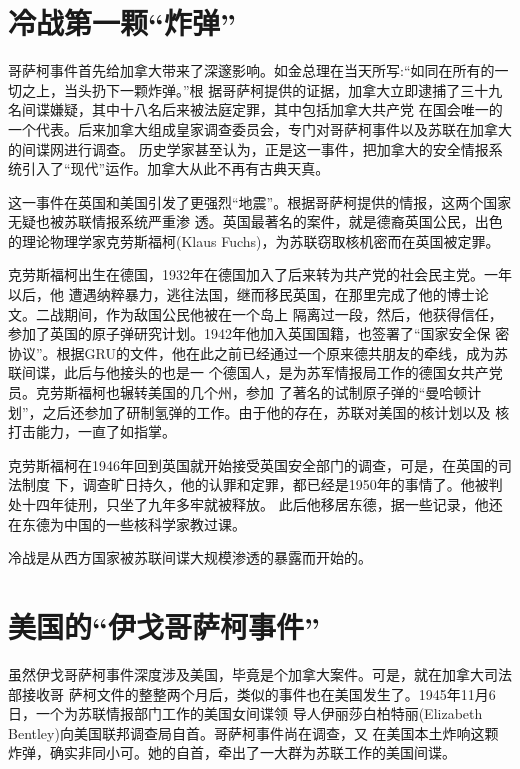 \documentclass[10pt]{article}
\begin{document}
{\pagebreak
\section{冷战第一颗``炸弹''}

哥萨柯事件首先给加拿大带来了深邃影响。如金总理在当天所写:``如同在所有的一切之上，当头扔下一颗炸弹。''根
据哥萨柯提供的证据，加拿大立即逮捕了三十九名间谍嫌疑，其中十八名后来被法庭定罪，其中包括加拿大共产党
在国会唯一的一个代表。后来加拿大组成皇家调查委员会，专门对哥萨柯事件以及苏联在加拿大的间谍网进行调查。
历史学家甚至认为，正是这一事件，把加拿大的安全情报系统引入了``现代''运作。加拿大从此不再有古典天真。

这一事件在英国和美国引发了更强烈``地震''。根据哥萨柯提供的情报，这两个国家无疑也被苏联情报系统严重渗
透。英国最著名的案件，就是德裔英国公民，出色的理论物理学家克劳斯\textperiodcentered 福柯(Klaus
Fuchs)，为苏联窃取核机密而在英国被定罪。

克劳斯\textperiodcentered 福柯出生在德国，1932年在德国加入了后来转为共产党的社会民主党。一年以后，他
遭遇纳粹暴力，逃往法国，继而移民英国，在那里完成了他的博士论文。二战期间，作为敌国公民他被在一个岛上
隔离过一段，然后，他获得信任，参加了英国的原子弹研究计划。1942年他加入英国国籍，也签署了``国家安全保
密协议''。根据GRU的文件，他在此之前已经通过一个原来德共朋友的牵线，成为苏联间谍，此后与他接头的也是一
个德国人，是为苏军情报局工作的德国女共产党员。克劳斯\textperiodcentered 福柯也辗转美国的几个州，参加
了著名的试制原子弹的``曼哈顿计划''，之后还参加了研制氢弹的工作。由于他的存在，苏联对美国的核计划以及
核打击能力，一直了如指掌。

克劳斯\textperiodcentered 福柯在1946年回到英国就开始接受英国安全部门的调查，可是，在英国的司法制度
下，调查旷日持久，他的认罪和定罪，都已经是1950年的事情了。他被判处十四年徒刑，只坐了九年多牢就被释放。
此后他移居东德，据一些记录，他还在东德为中国的一些核科学家教过课。

冷战是从西方国家被苏联间谍大规模渗透的暴露而开始的。

\pagebreak
\section{美国的``伊戈\textperiodcentered 哥萨柯事件''}

虽然伊戈\textperiodcentered 哥萨柯事件深度涉及美国，毕竟是个加拿大案件。可是，就在加拿大司法部接收哥
萨柯文件的整整两个月后，类似的事件也在美国发生了。1945年11月6日，一个为苏联情报部门工作的美国女间谍领
导人伊丽莎白\textperiodcentered 柏特丽(Elizabeth Bentley)向美国联邦调查局自首。哥萨柯事件尚在调查，又
在美国本土炸响这颗炸弹，确实非同小可。她的自首，牵出了一大群为苏联工作的美国间谍。

}
\end{document}
